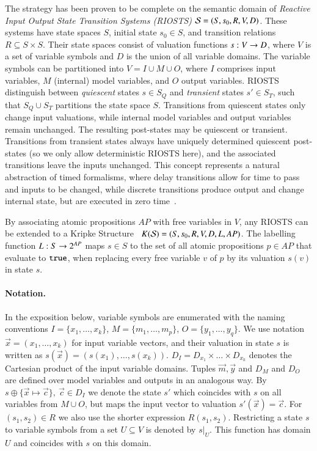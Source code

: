 The strategy has been proven to  be complete on the semantic domain of \emph{Reactive Input Output State Transition Systems (RIOSTS)} ${\cal S} = (S,s_0,R,V,D)$. These systems have state spaces $S$,
initial state $s_0\in S$, and transition relations $R\subseteq S\times S$. Their state spaces
consist of valuation functions $s: V\rightarrow D$, where $V$ is a set of variable symbols and $D$ is 
the union of all variable domains. The variable symbols can be partitioned into $V = I\cup M \cup O$,
where $I$ comprises input variables, $M$ (internal) model variables, and $O$ output variables.
RIOSTS distinguish between \emph{quiescent} states $s\in S_Q$ and \emph{transient} states $s'\in S_T$,
such that $S_Q\cup S_T$ partitions the state space $S$. Transitions from quiescent states only change
input valuations, while internal model variables and output variables remain unchanged. The
resulting post-states may be quiescent or transient. Transitions from transient states always have
uniquely determined quiescent post-states (so we only allow deterministic RIOSTS here), and the associated transitions  leave the inputs
unchanged. This concept represents a natural abstraction of timed formalisms, where 
delay transitions allow for time to pass and inputs to be changed, while discrete
transitions produce output and change internal state, but are executed in zero 
time~\cite[p.~687]{DBLP:books/daglib/0020348}.

By associating atomic propositions $AP$ with free variables in $V$, any RIOSTS can be extended to a 
Kripke Structure~\cite{clarke_em-etal:1999a} 
$K({\cal S}) = (S,s_0,R,V,D,L,AP)$. The labelling function $L:S\rightarrow 2^{AP}$
maps $s\in S$ to the set of all atomic propositions $p\in AP$ that evaluate to $\mbox{{\tt true}}$,
when replacing every free variable $v$ of $p$ by its valuation $s(v)$ in state $s$.

\paragraph{Notation.}
In the exposition below, variable symbols are enumerated with the naming conventions
   $I = \{ x_1,\dots,x_k\}$, $M = \{m_1,\dots, m_p\}$, $O = \{y_1,\dots,y_q\}$. We use   notation
$\vec x = (x_1,\dots,x_k)$  for input variable vectors, and their   valuation in state $s$ is written as $s(\vec x) = (s(x_1),\dots,s(x_k))$. $D_I = D_{x_1}\times\dots\times D_{x_k}$ denotes the Cartesian product of the input variable domains. Tuples $\vec m, \vec y$ and $D_M$ and $D_O$ are defined over model variables and outputs in an analogous way. By $s\oplus\{\vec x \mapsto \vec c\}, \ \vec c \in D_I$ we denote the state $s'$ which coincides with $s$ on all variables from $M\cup O$, but maps the input vector to valuation $s'(\vec x) = \vec c$. 
For $(s_1,s_2)\in R$ we also use the shorter expression $R(s_1,s_2)$.  Restricting a state $s$ to variable symbols from a set $U \subseteq V$ is denoted by $s|_U$. This function has domain $U$ and coincides with $s$ on this domain.

